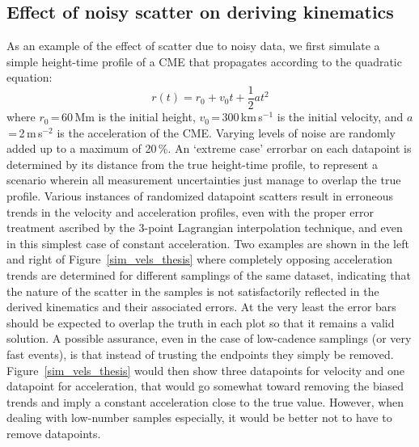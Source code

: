 \documentclass[structabstract]{aa}
\begin{document}
\subsection{Effect of noisy scatter on deriving kinematics}
\label{subsect:test_lagrange_const}


As an example of the effect of scatter due to noisy data, we first simulate a simple height-time profile of a CME that propagates according to the quadratic equation:
\begin{equation}
\label{eqn:const_a}
r(t) = r_0 + v_0 t + \frac{1}{2}a t^2
\end{equation}
where $r_0$\,=\,60\,Mm is the initial height, $v_0$\,=\,300\,km\,s$^{-1}$ is the initial velocity, and $a$\,=\,2\,m\,s$^{-2}$ is the acceleration of the CME. Varying levels of noise are randomly added up to a maximum of 20\,\%. An `extreme case' errorbar on each datapoint is determined by its distance from the true height-time profile, to represent a scenario wherein all measurement uncertainties just manage to overlap the true profile. Various instances of randomized datapoint scatters result in erroneous trends in the velocity and acceleration profiles, even with the proper error treatment ascribed by the 3-point Lagrangian interpolation technique, and even in this simplest case of constant acceleration. Two examples are shown in the left and right of Figure~\ref{sim_vels_thesis} where completely opposing acceleration trends are determined for different samplings of the same dataset, indicating that the nature of the scatter in the samples is not satisfactorily reflected in the derived kinematics and their associated errors. At the very least the error bars should be expected to overlap the truth in each plot so that it remains a valid solution. A possible assurance, even in the case of low-cadence samplings (or very fast events), is that instead of trusting the endpoints they simply be removed. Figure~\ref{sim_vels_thesis} would then show three datapoints for velocity and one datapoint for acceleration, that would go somewhat toward removing the biased trends and imply a constant acceleration close to the true value. However, when dealing with low-number samples especially, it would be better not to have to remove datapoints.
\end{document}
